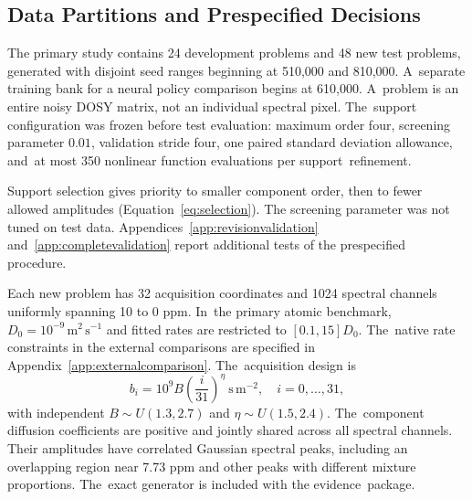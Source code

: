 \documentclass[mathematics,article,accept,moreauthors]{Definitions/mdpi}
\begin{document}
\subsection{Data Partitions and Prespecified Decisions}
The primary study contains 24 development problems and 48 new test problems, generated with disjoint seed ranges beginning at 510,000 and 810,000. A~separate training bank for a neural policy comparison begins at 610,000. A~problem is an entire noisy DOSY matrix, not an individual spectral pixel. The~support configuration was frozen before test evaluation: maximum order four, screening parameter $0.01$, validation stride four, one paired standard deviation allowance, and~at most 350 nonlinear function evaluations per support~refinement.

Support selection gives priority to smaller component order, then to fewer allowed amplitudes (Equation~\eqref{eq:selection}). The screening parameter was not tuned on test data. Appendices~\ref{app:revisionvalidation} and~\ref{app:completevalidation} report additional tests of the prespecified procedure.

Each new problem has 32 acquisition coordinates and 1024 spectral channels uniformly spanning 10 to 0 ppm. In~the primary atomic benchmark, $D_0=10^{-9}\,\mathrm{m^2\,s^{-1}}$ and fitted rates are restricted to $[0.1,15]D_0$. The~native rate constraints in the external comparisons are specified in Appendix~\ref{app:externalcomparison}. The~acquisition design is
\begin{equation}\label{eq:design}
 b_i=10^9 B\left(\frac{i}{31}\right)^\eta\ \mathrm{s\,m^{-2}},
 \quad i=0,\ldots,31,
\end{equation}
with independent $B\sim U(1.3,2.7)$ and $\eta\sim U(1.5,2.4)$. The~component diffusion coefficients are positive and jointly shared across all spectral channels. Their amplitudes have correlated Gaussian spectral peaks, including an overlapping region near 7.73 ppm and other peaks with different mixture proportions. The~exact generator is included with the evidence~package.

\end{document}
